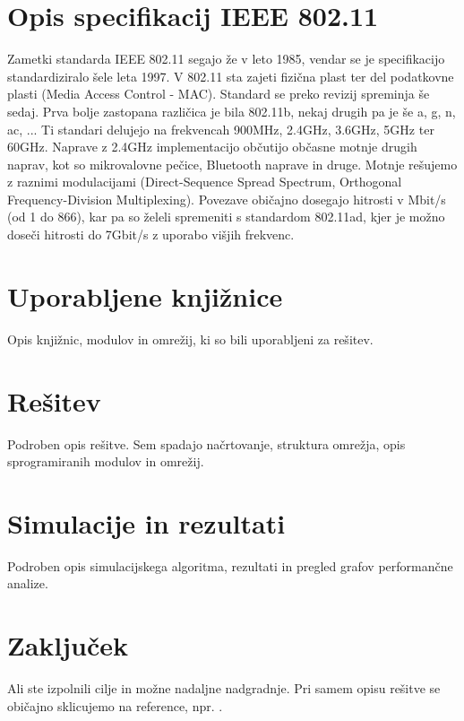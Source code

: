 \documentclass[11pt,a4paper,slovene]{myarticle}
\begin{document}
\section{Opis specifikacij IEEE 802.11}
Zametki standarda IEEE 802.11 segajo že v leto 1985, vendar se je specifikacijo standardiziralo šele leta 1997. V 802.11 sta zajeti fizična plast ter del podatkovne plasti (Media Access Control - MAC). Standard se preko revizij spreminja še sedaj. Prva bolje zastopana različica je bila 802.11b, nekaj drugih pa je še a, g, n, ac, ... Ti standari delujejo na frekvencah 900MHz, 2.4GHz, 3.6GHz, 5GHz ter 60GHz. Naprave z 2.4GHz implementacijo občutijo občasne motnje drugih naprav, kot so mikrovalovne pečice, Bluetooth naprave in druge. Motnje rešujemo z raznimi modulacijami (Direct-Sequence Spread Spectrum, Orthogonal Frequency-Division Multiplexing). Povezave običajno dosegajo hitrosti v Mbit/s (od 1 do 866), kar pa so želeli spremeniti s standardom 802.11ad, kjer je možno doseči hitrosti do 7Gbit/s z uporabo višjih frekvenc.

\section{Uporabljene knjižnice}
Opis knjižnic, modulov in omrežij, ki so bili uporabljeni za rešitev.

\section{Rešitev}
Podroben opis rešitve. Sem spadajo načrtovanje, struktura omrežja, opis sprogramiranih modulov in omrežij.

\section{Simulacije in rezultati}
Podroben opis simulacijskega algoritma, rezultati in pregled grafov performančne analize.

\section{Zaključek}
Ali ste izpolnili cilje in možne nadaljne nadgradnje. Pri samem opisu rešitve se običajno sklicujemo na reference, npr. \cite{omnetpp}. 

\pagebreak


\end{document}

